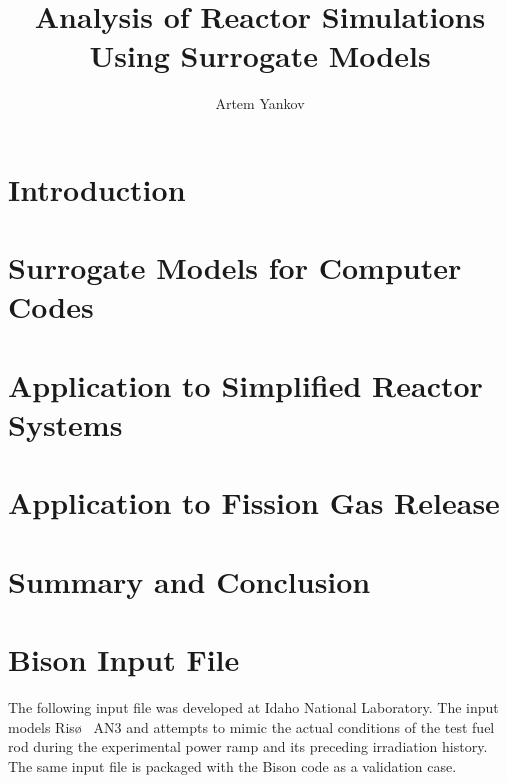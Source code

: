 \documentclass[thesis]{thesis-umich}
\title{Analysis of Reactor Simulations Using Surrogate Models}
\author{Artem Yankov}
\begin{document}
\chapter{Introduction}   \label{chap:intro}


\chapter{Surrogate Models for Computer Codes} \label{chap:rom}


\chapter{Application to Simplified Reactor Systems} \label{chap:applications}


%

\chapter{Application to Fission Gas Release} \label{chap:fgr}


\chapter{Summary and Conclusion} \label{chap:conclusion}


\appendix

\chapter{Bison Input File} 
\label{app:bison_riso_input}
The following input file was developed at Idaho National Laboratory. The input models Ris\o~ AN3 and attempts to mimic the actual conditions of the test fuel rod during the experimental power ramp and its preceding irradiation history. The same input file is packaged with the Bison code as a validation case.  
\end{document}

